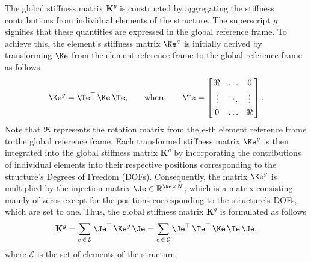 The global stiffness matrix $\mathbf{K}^{g}$ is constructed by aggregating the stiffness contributions from individual elements of the structure. The superscript $g$ signifies that these quantities are expressed in the global reference frame. To achieve this, the element's stiffness matrix $\Ke^{g}$ is initially derived by transforming $\Ke$ from the element reference frame to the global reference frame as follows
%
\begin{equation}
  \label{chap5:eq:element_stiffness_matrix}
  \Ke^{g} = \Te^\top \, \Ke \, \Te \text{,} \qquad \text{where} \qquad \Te = \left[\,\begin{matrix}
    \Re    & \ldots & 0 \\[0.25em]
    \vdots & \ddots & \vdots \\[0.25em]
    0      & \ldots & \Re
  \end{matrix}\,\right] \text{.}
\end{equation}
%
Note that $\Re$ represents the rotation matrix from the $e$-th element reference frame to the global reference frame. Each transformed stiffness matrix $\Ke^{g}$ is then integrated into the global stiffness matrix $\mathbf{K}^{g}$ by incorporating the contributions of individual elements into their respective positions corresponding to the structure's Degrees of Freedom (\acp{DOF}). Consequently, the matrix $\Ke^{g}$ is multiplied by the injection matrix $\Je \in \mathbb{R}^{\Ne \times N}$, which is a matrix consisting mainly of zeros except for the positions corresponding to the structure's \acp{DOF}, which are set to one. Thus, the global stiffness matrix $\mathbf{K}^{g}$ is formulated as follows
%
\begin{equation}
  \mathbf{K}^{g} = \sum_{e \, \in \, \mathcal{E}} \Je^\top \, \Ke^{g} \, \Je
   = \sum_{e \, \in \, \mathcal{E}} \Je^\top \, \Te^\top\,\Ke \, \Te \, \Je \text{,}
\end{equation}
%
where $\mathcal{E}$ is the set of elements of the structure.

